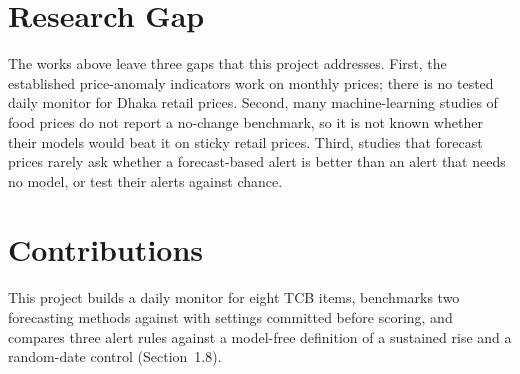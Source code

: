 \section{Research Gap}
The works above leave three gaps that this project addresses. First, the established price-anomaly indicators work on monthly prices; there is no tested daily monitor for Dhaka retail prices. Second, many machine-learning studies of food prices do not report a no-change benchmark, so it is not known whether their models would beat it on sticky retail prices. Third, studies that forecast prices rarely ask whether a forecast-based alert is better than an alert that needs no model, or test their alerts against chance.

\section{Contributions}
This project builds a daily monitor for eight TCB items, benchmarks two forecasting methods against \naive{} with settings committed before scoring, and compares three alert rules against a model-free definition of a sustained rise and a random-date control (Section~1.8).
